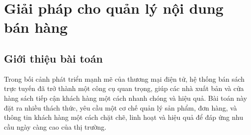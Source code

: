 \documentclass[../DoAn.tex]{subfiles}
\begin{document}




\section{Giải pháp cho quản lý nội dung bán hàng}
\subsection{Giới thiệu bài toán}
Trong bối cảnh phát triển mạnh mẽ của thương mại điện tử, hệ thống bán sách trực tuyến đã trở thành một công cụ quan trọng, giúp các nhà xuất bản và cửa hàng sách tiếp cận khách hàng một cách nhanh chóng và hiệu quả. Bài toán này đặt ra nhiều thách thức, yêu cầu một cơ chế quản lý sản phẩm, đơn hàng, và thông tin khách hàng một cách chặt chẽ, linh hoạt và hiệu quả để đáp ứng nhu cầu ngày càng cao của thị trường.
\end{document}
